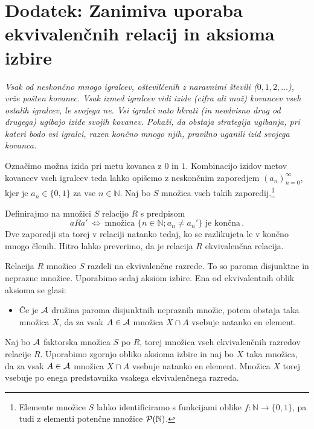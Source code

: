 \documentclass[11pt,paper=b5,DIV=13,headinclude,footinclude]{scrbook}
\def\cee {{~\Leftrightarrow~}}
\begin{document}
\section{Dodatek: Zanimiva uporaba ekvivalenčnih relacij in aksioma izbire}

\emph{ Vsak od neskončno mnogo igralcev, oštevilčenih z naravnimi števili ($0,1,2,\ldots$), vrže pošten kovanec.
Vsak izmed igralcev vidi izide (cifra ali mož) kovancev vseh ostalih igralcev, le svojega ne.
Vsi igralci nato hkrati (in neodvisno drug od drugega) ugibajo izide svojih kovanev.
Pokaži, da obstaja strategija ugibanja, pri kateri bodo vsi igralci, razen končno mnogo njih, pravilno uganili izid svojega kovanca.}

\bigskip
Označimo možna izida pri metu kovanca z $0$ in $1$.  Kombinacijo izidov metov kovancev vseh igralcev teda lahko opišemo
z neskončnim zaporedjem $(a_n)_{n = 0}^\infty$, kjer je $a_n\in \{0,1\}$ za vse $n\in \mathbb{N}$.
Naj bo $S$ množica vseh takih zaporedij.\footnote{Elemente množice $S$ lahko identificiramo s funkcijami
oblike $f:\mathbb{N}\to\{0,1\}$, pa tudi z elementi potenčne množice ${\cal P}(\mathbb{N})$.}


Definirajmo na množici $S$ relacijo $R$ s predpisom
$$aRa' \cee \textrm{množica $\{n\in \mathbb{N}; a_n\neq a_n'\}$ je končna}\,.$$
Dve zaporedji sta torej v relaciji natanko tedaj, ko se razlikujeta le v končno mnogo členih.
Hitro lahko preverimo, da je relacija $R$ ekvivalenčna relacija.

Relacija $R$ množico $S$ razdeli na ekvivalenčne razrede.
To so paroma disjunktne in neprazne množice.
Uporabimo sedaj aksiom izbire. Ena od ekvivalentnih oblik aksioma se glasi:
\begin{itemize}
 \item Če je ${\cal A}$ družina paroma disjunktnih nepraznih množic, potem obstaja taka  množica $X$, da za vsak $A\in {\cal A}$ množica $X\cap A$ vsebuje natanko en element.
\end{itemize}
Naj bo ${\cal A}$ faktorska množica $S$ po $R$, torej množica vseh ekvivalenčnih razredov relacije $R$.
Uporabimo zgornjo obliko aksioma izbire in naj bo $X$ taka množica, da za vsak $A\in {\cal A}$ množica $X\cap A$ vsebuje natanko en element.
Množica $X$ torej vsebuje po enega predstavnika vsakega ekvivalenčnega razreda.
\end{document}
